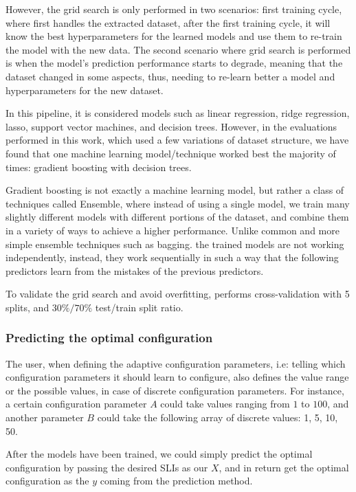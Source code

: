 However, the grid search is only performed in two scenarios: first training cycle, where \projectname{} first handles the extracted dataset, after the first training cycle, it will know the best hyperparameters for the learned models and use them to re-train the model with the new data. The second scenario where grid search is performed is when the model's prediction performance starts to degrade, meaning that the dataset changed in some aspects, thus, needing to re-learn better a model and hyperparameters for the new dataset.

In this pipeline, it is considered models such as linear regression, ridge regression, lasso, support vector machines, and decision trees. However, in the evaluations performed in this work, which used a few variations of dataset structure, we have found that one machine learning model/technique worked best the majority of times: gradient boosting with decision trees. 

Gradient boosting is not exactly a machine learning model, but rather a class of techniques called Ensemble, where instead of using a single model, we train many slightly different models with different portions of the dataset, and combine them in a variety of ways to achieve a higher performance. Unlike common and more simple ensemble techniques such as bagging. the trained models are not working independently, instead, they work sequentially in such a way that the following predictors learn from the mistakes of the previous predictors.

To validate the grid search and avoid overfitting, \projectname{} performs cross-validation with 5 splits, and $30\%\slash70\%$ test/train split ratio.

\subsubsection{Predicting the optimal configuration}

The user, when defining the adaptive configuration parameters, i.e: telling \projectname{} which configuration parameters it should learn to configure, also defines the value range or the possible values, in case of discrete configuration parameters. For instance, a certain configuration parameter $A$ could take values ranging from $1$ to $100$, and another parameter $B$ could take the following array of discrete values: 1, 5, 10, 50.

After the models have been trained, we could simply predict the optimal configuration by passing the desired SLIs as our $X$, and in return get the optimal configuration as the $y$ coming from the prediction method.

